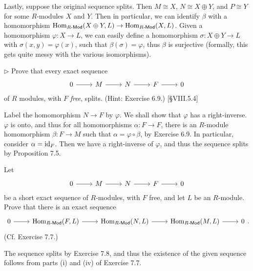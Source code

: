 \begin{solution}
	Lastly, suppose the original sequence splits. Then $M \cong X$, $N \cong X \oplus Y$, and $P \cong Y$ for some $R$-modules $X$ and $Y$. Then in particular, we can identify $\beta$ with a homomorphism $\mathrm{Hom}_{R\text{-}\mathsf{Mod}}(X \oplus Y, L) \to \mathrm{Hom}_{R\text{-}\mathsf{Mod}}(X, L)$. Given a homomorphism $\varphi: X \to L$, we can easily define a homomorphism $\sigma: X \oplus Y \to L$ with $\sigma(x, y) = \varphi(x)$, such that $\beta(\sigma) = \varphi$, thus $\beta$ is surjective (formally, this gets quite messy with the various isomorphisms).
\end{solution}

\begin{problem}
	$\triangleright$ Prove that every exact sequence
	\[
		\begin{tikzcd}
			0
			\arrow[r]
			& M
			\arrow[r]
			& N
			\arrow[r]
			& F
			\arrow[r]
			& 0
		\end{tikzcd}
	\]
	of $R$ modules, with $F$ \emph{free}, splits. (Hint: Exercise 6.9.) [\S VIII.5.4]
\end{problem}

\begin{solution}
	Label the homomorphism $N \to F$ by $\varphi$. We shall show that $\varphi$ has a right-inverse. $\varphi$ is onto, and thus for all homomorphisms $\alpha: F \to F$, there is an $R$-module homomorphism $\beta: F \to M$ such that $\alpha = \varphi \circ \beta$, by Exercise 6.9. In particular, consider $\alpha = \mathrm{id}_F$. Then we have a right-inverse of $\varphi$, and thus the sequence splits by Proposition 7.5.
\end{solution}

\begin{problem}
	Let
	\[
		\begin{tikzcd}
			0
			\arrow[r]
			& M
			\arrow[r]
			& N
			\arrow[r]
			& F
			\arrow[r]
			& 0
		\end{tikzcd}
	\]
	be a short exact sequence of $R$-modules, with $F$ free, and let $L$ be an $R$-module. Prove that there is an exact sequence
	\[
		\begin{tikzcd}
			0
			\arrow[r]
			& \Hom_{\CRmod}(F, L)
			\arrow[r]
			& \Hom_{\CRmod}(N, L)
			\arrow[r]
			& \Hom_{\CRmod}(M, L)
			\arrow[r]
			& 0
		\end{tikzcd} \text{.}
	\]
	(Cf. Exercise 7.7.)
\end{problem}

\begin{solution}
	The sequence splits by Exercise 7.8, and thus the existence of the given sequence follows from parts (i) and (iv) of Exercise 7.7.
\end{solution}

